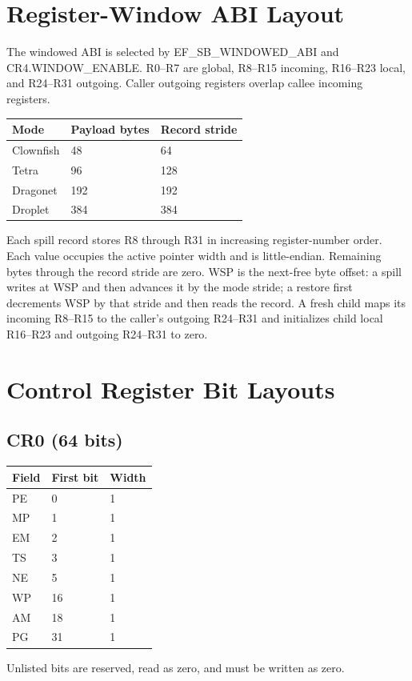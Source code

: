 \documentclass[10pt]{article}
\begin{document}
\section{Register-Window ABI Layout}
The windowed ABI is selected by EF\_SB\_WINDOWED\_ABI and CR4.WINDOW\_ENABLE. R0--R7 are global, R8--R15 incoming, R16--R23 local, and R24--R31 outgoing. Caller outgoing registers overlap callee incoming registers.
\begin{longtable}{@{}L{3cm}L{3cm}L{3cm}@{}}
\toprule Mode & Payload bytes & Record stride \\ \midrule
Clownfish & 48 & 64 \\
Tetra & 96 & 128 \\
Dragonet & 192 & 192 \\
Droplet & 384 & 384 \\
\bottomrule\end{longtable}

Each spill record stores R8 through R31 in increasing register-number order.
Each value occupies the active pointer width and is little-endian. Remaining
bytes through the record stride are zero. WSP is the next-free byte offset:
a spill writes at WSP and then advances it by the mode stride; a restore first
decrements WSP by that stride and then reads the record. A fresh child maps its
incoming R8--R15 to the caller's outgoing R24--R31 and initializes child local
R16--R23 and outgoing R24--R31 to zero.

\section{Control Register Bit Layouts}
\subsection{CR0 (64 bits)}
\begin{longtable}{@{}L{4.5cm}L{2cm}L{2cm}@{}}
\toprule Field & First bit & Width \\ \midrule
PE & 0 & 1 \\
MP & 1 & 1 \\
EM & 2 & 1 \\
TS & 3 & 1 \\
NE & 5 & 1 \\
WP & 16 & 1 \\
AM & 18 & 1 \\
PG & 31 & 1 \\
\bottomrule\end{longtable}
Unlisted bits are reserved, read as zero, and must be written as zero.
\end{document}
